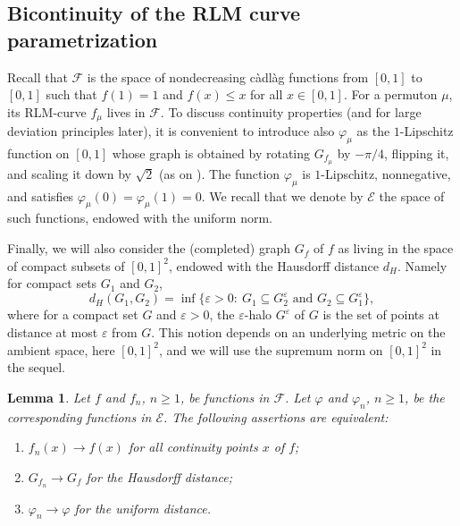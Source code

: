 \documentclass[a4paper,11pt]{amsart}
\newcommand{\eps}{\varepsilon}
\newtheorem{lem}[thm]{Lemma}
\theoremstyle{definition}
\begin{document}
\subsection{Bicontinuity of the RLM curve parametrization}\label{subsec:231_continuity}
Recall that $\mathcal{F}$ is the space of nondecreasing càdlàg functions from $[0,1]$ to $[0,1]$ such that $f(1)=1$ and $f(x)\le x$ for all $x\in[0,1]$.
For a permuton $\mu$, its RLM-curve $f_\mu$ lives in $\mathcal F$.
To discuss continuity properties (and for large deviation principles later), it is convenient to introduce also $\varphi_\mu$ as the $1$-Lipschitz function on $[0,1]$ whose graph is obtained by rotating $G_{f_\mu}$ by $-\pi/4$, flipping it, and scaling it down by $\sqrt2$ (as on ).
The function $\varphi_\mu$ is $1$-Lipschitz, nonnegative, and satisfies $\varphi_\mu(0)=\varphi_\mu(1)=0$.
We recall that we denote by $\mathcal E$ the space of such functions, 
endowed with the uniform norm.

Finally, we will also consider the (completed) graph $G_f$ of $f$ as living in the space of compact subsets of $[0,1]^2$, endowed with the Hausdorff distance $d_H$.
Namely for compact sets $G_1$ and $G_2$, 
\[d_H(G_1,G_2) = \inf \{\eps>0:\ G_1 \subseteq G_2^\eps \mbox{ and } G_2 \subseteq G_1^\eps\},\]
where for a compact set $G$ and $\eps>0$, the $\eps$-halo $G^\eps$ of $G$ is the set of points at distance at most $\eps$ from $G$.
This notion depends on an underlying metric on the ambient space, here $[0,1]^2$, and we will use the supremum norm on $[0,1]^2$ in the sequel.

\begin{lem}\label{lem: equiv cv f and G_f and varphi}
    Let $f$ and $f_n$, $n\ge1$, be functions in $\mathcal{F}$.
    Let $\varphi$ and $\varphi_n$, $n\ge1$, be the corresponding functions in $\mathcal{E}$.
    The following assertions are equivalent:
    \begin{enumerate}[label=(\roman*)]
        \item $f_n(x) \to f(x)$ for all continuity points $x$ of $f$;
        \item $G_{f_n} \to G_f$ for the Hausdorff distance;
        \item $\varphi_n \to \varphi$ for the uniform distance.
    \end{enumerate}
\end{lem}
\end{document}
